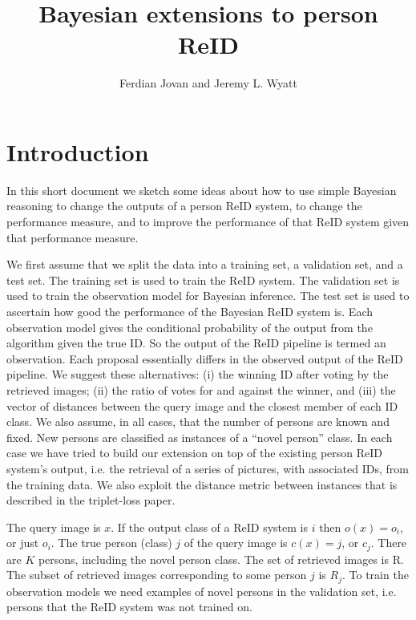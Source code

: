 \documentclass[10pt,a4paper,final]{article}
\title{Bayesian extensions to person ReID}
\author{Ferdian Jovan and Jeremy L. Wyatt}
\begin{document}
\maketitle

\section{Introduction}
In this short document we sketch some ideas about how to use simple Bayesian reasoning to change the outputs of a person ReID system, to change the performance measure, and to improve the performance of that ReID system given that performance measure.

We first assume that we split the data into a training set, a validation set, and a test set. The training set is used to train the ReID system. The validation set is used to train the observation model for Bayesian inference. The test set is used to ascertain how good the performance of the Bayesian ReID system is. Each observation model gives the conditional probability of the output from the algorithm given the true ID. So the output of the ReID pipeline is termed an observation. Each proposal essentially differs in the observed output of the ReID pipeline. We suggest these alternatives: (i) the winning ID after voting by the retrieved images; (ii) the ratio of votes for and against the winner, and (iii) the vector of distances between the query image and the closest member of each ID class. %
We also assume, in all cases, that the number of persons are known and fixed. New persons are classified as instances of a ``novel person'' class. In each case we have tried to build our extension on top of the existing person ReID system's output, i.e. the retrieval of a series of pictures, with associated IDs, from the training data. We also exploit the distance metric between instances that is described in the triplet-loss paper.

The query image is $x$. If the output class of a ReID system is $i$ then $o(x)=o_i$, or just $o_i$.  The true person (class) $j$ of the query image is $c(x)=j$, or $c_j$. There are $K$ persons, including the novel person class. The set of retrieved images is R. The subset of retrieved images corresponding to some person $j$ is $R_j$. To train the observation models we need examples of novel persons in the validation set, i.e. persons that the ReID system was not trained on.
\end{document}
